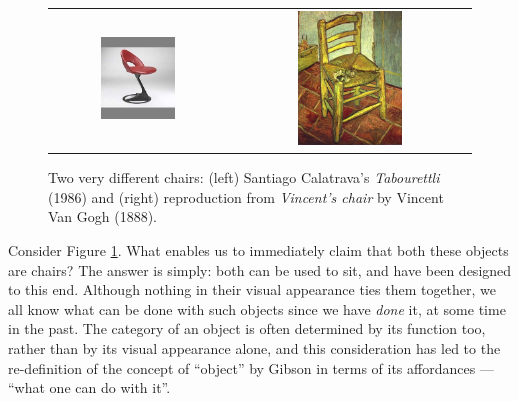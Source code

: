 \begin{figure}[!h] \centering
  \begin{tabular}{cc}
    \includegraphics[width=0.45\textwidth]{images/chair_calatrava} &
    \includegraphics[width=0.45\textwidth]{images/chair_vangogh} \\
  \end{tabular}
  \caption{Two very different chairs: (left) Santiago Calatrava's \emph{Tabourettli}
    (1986) and (right) reproduction from \emph{Vincent's chair} by Vincent Van Gogh
    (1888).}
  \label{fig:chairs}
\end{figure}

Consider Figure \ref{fig:chairs}. What enables us to immediately claim that both
these objects are chairs? The answer is simply: both can be used to sit, and have
been designed to this end. Although nothing in
their visual appearance ties them together, we all know what can be done with such
objects since we have \emph{done} it, at some time in the past. The category of an object
is often determined by its function too, rather than by its visual appearance alone,
and this consideration has led to the re-definition of the concept of ``object''
by Gibson \cite{gibson1,gibson2} in terms of its affordances --- ``what one can do with it''.

